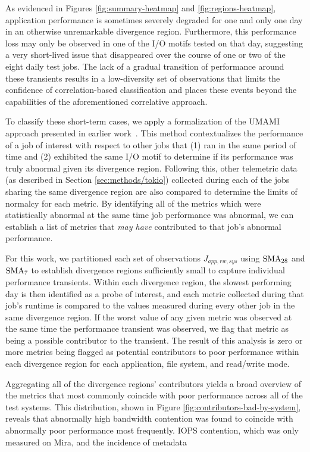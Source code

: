 As evidenced in Figures \ref{fig:summary-heatmap} and \ref{fig:regions-heatmap}, application performance is sometimes severely degraded for one and only one day in an otherwise unremarkable divergence region.
Furthermore, this performance loss may only be observed in one of the I/O motifs tested on that day, suggesting a very short-lived issue that disappeared over the course of one or two of the eight daily test jobs.
The lack of a gradual transition of performance around these transients results in a low-diversity set of observations that limits the confidence of correlation-based classification and places these events beyond the capabilities of the aforementioned correlative approach.

To classify these short-term cases, we apply a formalization of the UMAMI approach presented in earlier work~\cite{Lockwood2017}.
This method contextualizes the performance of a job of interest with respect to other jobs that (1) ran in the same period of time and (2) exhibited the same I/O motif to determine if its performance was truly abnormal given its divergence region.
Following this, other telemetric data (as described in Section \ref{sec:methods/tokio}) collected during each of the jobs sharing the same divergence region are also compared to determine the limits of normalcy for each metric.
By identifying all of the metrics which were statistically abnormal at the same time job performance was abnormal, we can establish a list of metrics that \emph{may have} contributed to that job's abnormal performance.

For this work, we partitioned each set of observations $J_{app, rw, sys}$ using $\textup{SMA}_{28}$ and $\textup{SMA}_{7}$ to establish divergence regions sufficiently small to capture individual performance transients.
Within each divergence region, the slowest performing day is then identified as a probe of interest, and each metric collected during that job's runtime is compared to the values measured during every other job in the same divergence region.
If the worst value of any given metric was observed at the same time the performance transient was observed, we flag that metric as being a possible contributor to the transient.
The result of this analysis is zero or more metrics being flagged as potential contributors to poor performance within each divergence region for each application, file system, and read/write mode.

Aggregating all of the divergence regions' contributors yields a broad overview of the metrics that most commonly coincide with poor performance across all of the test systems.
This distribution, shown in Figure \ref{fig:contributors-bad-by-system}, reveals that abnormally high bandwidth contention was found to coincide with abnormally poor performance most frequently.
IOPS contention, which was only measured on Mira, and the incidence of metadata 


